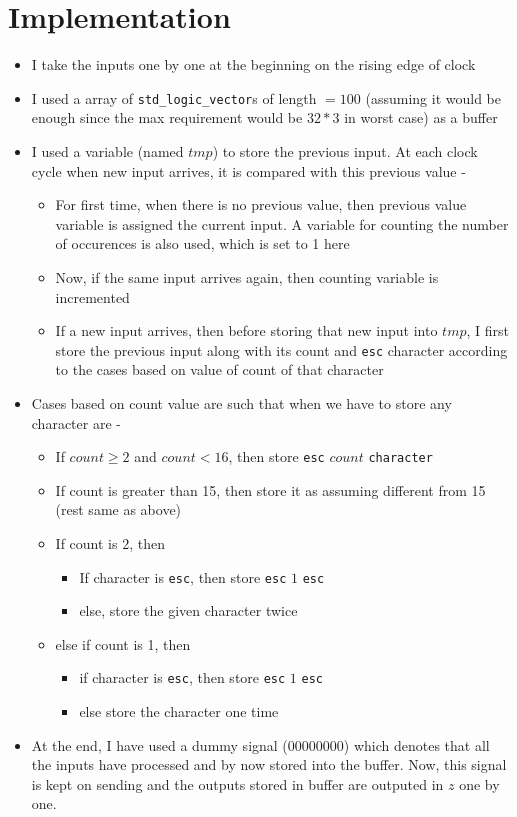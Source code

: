 \documentclass[12pt,a4paper]{article}
\begin{document}
\section{Implementation}
\begin{itemize}
    \item I take the inputs one by one at the beginning on the rising edge of clock
    \item I used a array of \texttt{std\_logic\_vector}s of length $ = 100$ (assuming it would be enough since the max requirement would be $32*3$ in worst case) as a buffer
    \item I used a variable (named $tmp$) to store the previous input. At each clock cycle when new input arrives, it is compared with this previous value -
    \begin{itemize}
        \item For first time, when there is no previous value, then previous value variable is assigned the current input. A variable for counting the number of occurences is also used, which is set to 1 here
        \item Now, if the same input arrives again, then counting variable is incremented
        \item If a new input arrives, then before storing that new input into $tmp$, I first store the previous input along with its count and \texttt{esc} character according to the cases based on value of count of that character
    \end{itemize}
    \item Cases based on count value are such that when we have to store any character are -
    \begin{itemize}
        \item If $count \geq 2$ and $count < 16$, then store \texttt{esc} $count$ \texttt{character}
        \item If count is greater than 15, then store it as assuming different from 15 (rest same as above)
        \item If count is $2$, then 
        \begin{itemize}
            \item If character is \texttt{esc}, then store \texttt{esc} $1$ \texttt{esc}
            \item else, store the given character twice
        \end{itemize}
        \item else if count is 1, then
        \begin{itemize}
            \item if character is \texttt{esc}, then store \texttt{esc} $1$ \texttt{esc}
            \item else store the character one time
        \end{itemize}
    \end{itemize}
    \item At the end, I have used a dummy signal ($00000000$) which denotes that all the inputs have processed and by now stored into the buffer. Now, this signal is kept on sending and the outputs stored in buffer are outputed in $z$ one by one.
\end{itemize}
\end{document}
